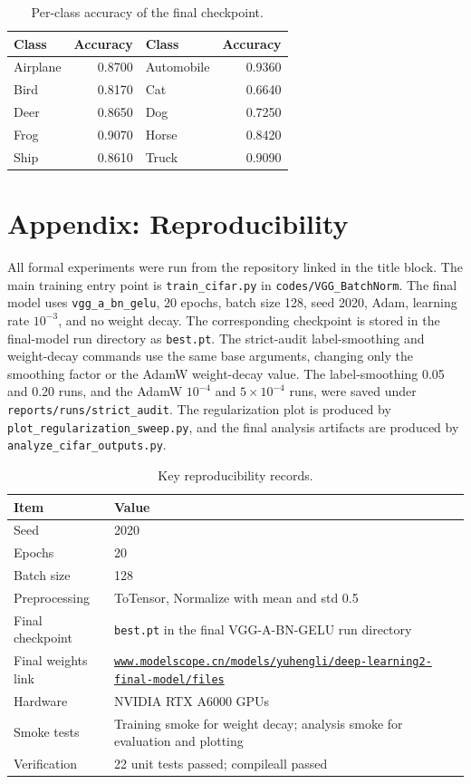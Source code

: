 \documentclass[10pt,twocolumn]{article}
\newcommand{\modelscope}{\href{https://www.modelscope.cn/models/yuhengli/deep-learning2-final-model/files}{\nolinkurl{www.modelscope.cn/models/yuhengli/deep-learning2-final-model/files}}}
\begin{document}
\begin{table}[H]
\centering
\caption{Per-class accuracy of the final checkpoint.}
\label{tab:perclass}
\scriptsize
\begin{tabular}{lrlr}
\toprule
Class & Accuracy & Class & Accuracy\\
\midrule
Airplane & 0.8700 & Automobile & 0.9360\\
Bird & 0.8170 & Cat & 0.6640\\
Deer & 0.8650 & Dog & 0.7250\\
Frog & 0.9070 & Horse & 0.8420\\
Ship & 0.8610 & Truck & 0.9090\\
\bottomrule
\end{tabular}
\end{table}

\section{Appendix: Reproducibility}
All formal experiments were run from the repository linked in the title block. The main training entry point is \texttt{train\_cifar.py} in \texttt{codes/VGG\_BatchNorm}. The final model uses \texttt{vgg\_a\_bn\_gelu}, 20 epochs, batch size 128, seed 2020, Adam, learning rate $10^{-3}$, and no weight decay. The corresponding checkpoint is stored in the final-model run directory as \texttt{best.pt}. The strict-audit label-smoothing and weight-decay commands use the same base arguments, changing only the smoothing factor or the AdamW weight-decay value. The label-smoothing 0.05 and 0.20 runs, and the AdamW $10^{-4}$ and $5\times10^{-4}$ runs, were saved under \texttt{reports/runs/strict\_audit}. The regularization plot is produced by \texttt{plot\_regularization\_sweep.py}, and the final analysis artifacts are produced by \texttt{analyze\_cifar\_outputs.py}.

\begin{table}[H]
\centering
\caption{Key reproducibility records.}
\label{tab:repro}
\scriptsize
\begin{tabular}{p{}p{}}
\toprule
Item & Value\\
\midrule
Seed & 2020\\
Epochs & 20\\
Batch size & 128\\
Preprocessing & ToTensor, Normalize with mean and std 0.5\\
Final checkpoint & \texttt{best.pt} in the final VGG-A-BN-GELU run directory\\
Final weights link & \modelscope\\
Hardware & NVIDIA RTX A6000 GPUs\\
Smoke tests & Training smoke for weight decay; analysis smoke for evaluation and plotting\\
Verification & 22 unit tests passed; compileall passed\\
\bottomrule
\end{tabular}
\end{table}
\end{document}
